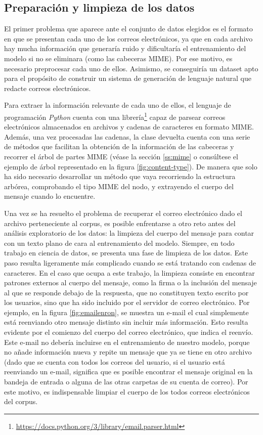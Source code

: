 \subsection{Preparación y limpieza de los datos}\label{ss:prep}

El primer problema que aparece ante el conjunto de datos elegidos es el formato en que se presentan cada uno de los correos electrónicos, ya que en cada archivo hay mucha información que generaría ruido y dificultaría el entrenamiento del modelo si no se eliminara (como las cabeceras MIME). Por ese motivo, es necesario preprocesar cada uno de ellos. Asimismo, se conseguiría un dataset apto para el propósito de construir un sistema de generación de lenguaje natural que redacte correos electrónicos.

Para extraer la información relevante de cada uno de ellos, el lenguaje de programación \textit{Python} cuenta con una librería\footnote{\url{https://docs.python.org/3/library/email.parser.html}} capaz de parsear correos electrónicos almacenados en archivos y cadenas de caracteres en formato MIME. Además, una vez procesadas las cadenas, la clase devuelta cuenta con una serie de métodos que facilitan la obtención de la información de las cabeceras y recorrer el árbol de partes MIME (véase la sección \ref{ss:mime} o consúltese el ejemplo de árbol representado en la figura \ref{fig:content-type}). De manera que solo ha sido necesario desarrollar un método que vaya recorriendo la estructura arbórea, comprobando el tipo MIME del nodo, y extrayendo el cuerpo del mensaje cuando lo encuentre.

Una vez se ha resuelto el problema de recuperar el correo electrónico dado el archivo perteneciente al corpus, es posible enfrentarse a otro reto antes del análisis exploratorio de los datos: la limpieza del cuerpo del mensaje para contar con un texto plano de cara al entrenamiento del modelo. Siempre, en todo trabajo en ciencia de datos, se presenta una fase de limpieza de los datos. Este paso resulta ligeramente más complicado cuando se está tratando con cadenas de caracteres. En el caso que ocupa a este trabajo, la limpieza consiste en encontrar patrones externos al cuerpo del mensaje, como la firma o la inclusión del mensaje al que se responde debajo de la respuesta, que no constituyen texto escrito por los usuarios, sino que ha sido incluido por el servidor de correo electrónico. Por ejemplo, en la figura \ref{fig:emailenron}, se muestra un e-mail el cual simplemente está reenviando otro mensaje distinto sin incluir más información. Esto resulta evidente por el comienzo del cuerpo del correo electrónico, que indica el reenvío. Este e-mail no debería incluirse en el entrenamiento de nuestro modelo, porque no añade información nueva y repite un mensaje que ya se tiene en otro archivo (dado que se cuenta con todos los correos del usuario, si el usuario está reenviando un e-mail, significa que es posible encontrar el mensaje original en la bandeja de entrada o alguna de las otras carpetas de su cuenta de correo). Por este motivo, es indispensable limpiar el cuerpo de los todos correos electrónicos del corpus.

